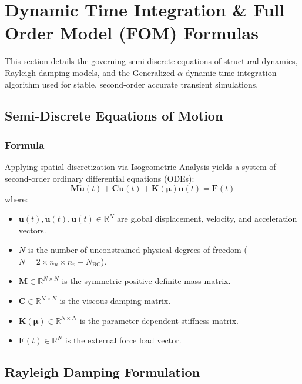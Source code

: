 \section{Dynamic Time Integration \& Full Order Model (FOM) Formulas}
\label{sec:time_integration}

This section details the governing semi-discrete equations of structural dynamics, Rayleigh damping models, and the Generalized-$\alpha$ dynamic time integration algorithm used for stable, second-order accurate transient simulations.

\subsection{Semi-Discrete Equations of Motion}

\subsubsection{Formula}
Applying spatial discretization via Isogeometric Analysis yields a system of second-order ordinary differential equations (ODEs):
\begin{equation}
\mathbf{M} \ddot{\mathbf{u}}(t) + \mathbf{C} \dot{\mathbf{u}}(t) + \mathbf{K}(\boldsymbol{\mu}) \mathbf{u}(t) = \mathbf{F}(t)
\end{equation}
where:
\begin{itemize}
    \item $\mathbf{u}(t), \dot{\mathbf{u}}(t), \ddot{\mathbf{u}}(t) \in \mathbb{R}^N$ are global displacement, velocity, and acceleration vectors.
    \item $N$ is the number of unconstrained physical degrees of freedom ($N = 2 \times n_u \times n_v - N_{\text{BC}}$).
    \item $\mathbf{M} \in \mathbb{R}^{N \times N}$ is the symmetric positive-definite mass matrix.
    \item $\mathbf{C} \in \mathbb{R}^{N \times N}$ is the viscous damping matrix.
    \item $\mathbf{K}(\boldsymbol{\mu}) \in \mathbb{R}^{N \times N}$ is the parameter-dependent stiffness matrix.
    \item $\mathbf{F}(t) \in \mathbb{R}^N$ is the external force load vector.
\end{itemize}

\hr

\subsection{Rayleigh Damping Formulation}

